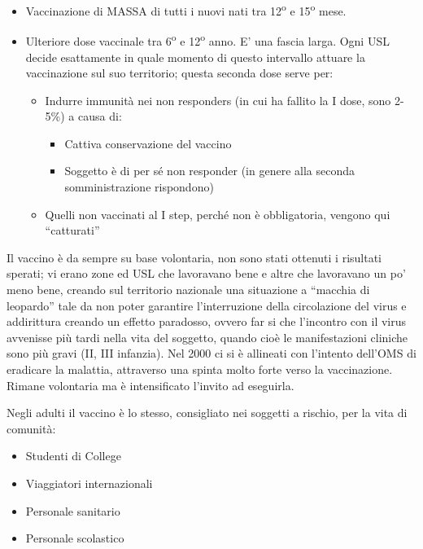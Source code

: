 \begin{itemize}
\item
  Vaccinazione di MASSA di tutti i nuovi nati tra 12\textsuperscript{o} e 15\textsuperscript{o} mese.
\item
  Ulteriore dose vaccinale tra 6\textsuperscript{o} e 12\textsuperscript{o} anno. E' una fascia larga. Ogni
  USL decide esattamente in quale momento di questo intervallo attuare
  la vaccinazione sul suo territorio; questa seconda dose serve per:
\begin{itemize}
\item
  Indurre immunità nei non responders (in cui ha fallito la I dose, sono
  2-5\%) a causa di: 

  \begin{itemize}
  \item
    Cattiva conservazione del vaccino
  \item
    Soggetto è di per sé non responder (in genere alla seconda
    somministrazione rispondono)
  \end{itemize}
\item
  Quelli non vaccinati al I step, perché non è obbligatoria, vengono qui
  ``catturati''
\end{itemize}
\end{itemize}

Il vaccino è da sempre su base volontaria, non sono stati ottenuti i
risultati sperati; vi erano zone ed USL che lavoravano bene e altre che
lavoravano un po' meno bene, creando sul territorio nazionale una
situazione a ``macchia di leopardo'' tale da non poter garantire
l'interruzione della circolazione del virus e addirittura creando un
effetto paradosso, ovvero far si che l'incontro con il virus avvenisse
più tardi nella vita del soggetto, quando cioè le manifestazioni
cliniche sono più gravi (II, III infanzia). Nel 2000 ci si è allineati
con l'intento dell'OMS di eradicare la malattia, attraverso una spinta
molto forte verso la vaccinazione. Rimane volontaria ma è intensificato
l'invito ad eseguirla.

Negli adulti il vaccino è lo stesso, consigliato nei soggetti a rischio,
per la vita di comunità:

\begin{itemize}
\item
  Studenti di College
\item
  Viaggiatori internazionali
\item
  Personale sanitario
\item
  Personale scolastico
\end{itemize}

